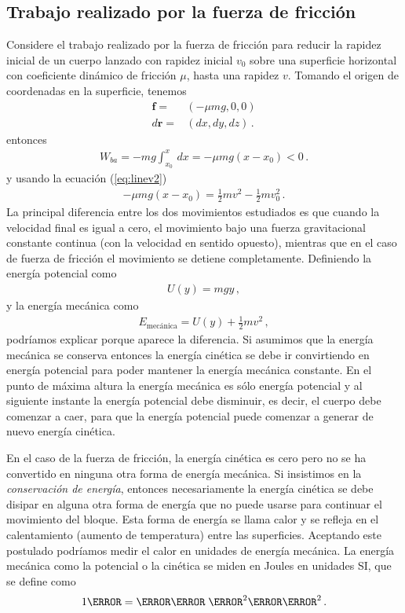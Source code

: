 \subsection{Trabajo realizado por la fuerza de fricción}
Considere el trabajo realizado por la fuerza de fricción para reducir
la rapidez inicial de un cuerpo lanzado con rapidez inicial $v_0$
sobre una superficie horizontal con coeficiente dinámico de fricción
$\mu$, hasta una rapidez $v$. Tomando el origen de coordenadas en la
superficie, tenemos
\begin{align*}
  \mathbf{f}=&(-\mu m g,0,0)\nonumber\\
  d\mathbf{r}=&(dx,dy,dz)\,.
\end{align*}
entonces
\begin{align*}
  W_{ba}=-mg\int_{x_0}^x\,dx=-\mu mg(x-x_0)<0\,.
\end{align*}
y usando la ecuación (\ref{eq:linev2})
\begin{align*}
  \label{eq:consrven}
  -\mu mg(x-x_0)=\tfrac{1}{2}m v^2-\tfrac{1}{2}m v_0^2\,.
\end{align*}
La principal diferencia entre los dos movimientos estudiados es que
cuando la velocidad final es igual a cero, el movimiento bajo una
fuerza gravitacional constante continua (con la velocidad en sentido
opuesto), mientras que en el caso de fuerza de fricción el movimiento
se detiene completamente. Definiendo la energía potencial como
\begin{align*}
  U(y)=mg y\,,
\end{align*}
y la energía mecánica como
\begin{align*}
  E_{\text{mecánica}}=U(y)+\tfrac{1}{2}m v^2\,,
\end{align*}
podríamos explicar porque aparece la diferencia. Si asumimos que la
energía mecánica se conserva entonces la energía cinética se debe ir
convirtiendo en energía potencial para poder mantener la energía
mecánica constante. En el punto de máxima altura la energía mecánica
es sólo energía potencial y al siguiente instante la energía potencial
debe disminuir, es decir, el cuerpo debe comenzar a caer, para que la
energía potencial puede comenzar a generar de nuevo energía cinética. 

En el caso de la fuerza de fricción, la energía cinética es cero pero
no se ha convertido en ninguna otra forma de energía mecánica. Si
insistimos en la \emph{conservación de energía}, entonces
necesariamente la energía cinética se debe disipar en alguna otra
forma de energía que no puede usarse para continuar el movimiento del
bloque. Esta forma de energía se llama calor y se refleja en el
calentamiento (aumento de temperatura) entre las
superficies. Aceptando este postulado podríamos medir el calor en
unidades de energía mecánica. La energía mecánica como la potencial o
la cinética se miden en Joules en unidades SI, que se define como
\begin{align*}
  1\joule=\kilo\gram\; \meter^2\per\second^2\,.
\end{align*}

